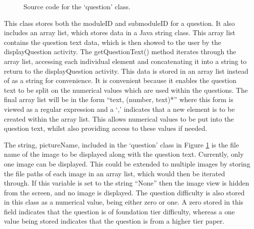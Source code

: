 \documentclass{article}
\begin{document}
\begin{figure}[H]
	\centering
	\caption{Source code for the `question' class.}
	\label{figure:questionClass}
\end{figure}

This class stores both the moduleID and submoduleID for a question. It also includes an array list, which stores data in a Java string class. This array list contains the question text data, which is then showed to the user by the displayQuestion activity. The getQuestionText() method iterates through the array list, accessing each individual element and concatenating it into a string to return to the displayQuestion activity. This data is stored in an array list instead of as a string for convenience. It is convenient because it enables the question text to be split on the numerical values which are used within the questions. The final array list will be in the form ``text, (number, text)*'' where this form is viewed as a regular expression and a `,' indicates that a new element is to be created within the array list. This allows numerical values to be put into the question text, whilst also providing access to these values if needed. \par

The string, pictureName, included in the `question' class in Figure \ref{figure:questionClass} is the file name of the image to be displayed along with the question text. Currently, only one image can be displayed. This could be extended to multiple images by storing the file paths of each image in an array list, which would then be iterated through. If this variable is set to the string ``None'' then the image view is hidden from the screen, and no image is displayed. The question difficulty is also stored in this class as a numerical value, being either zero or one. A zero stored in this field indicates that the question is of foundation tier difficulty, whereas a one value being stored indicates that the question is from a higher tier paper. \par
\end{document}
